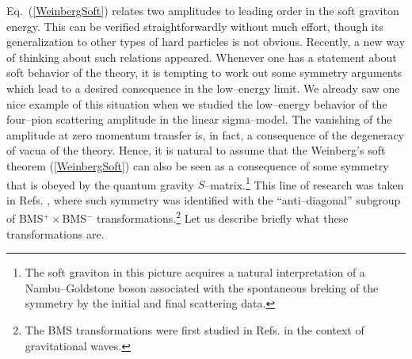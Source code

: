 \documentclass[12pt]{article}
\begin{document}
Eq.~(\ref{WeinbergSoft}) relates two amplitudes to leading order in the soft graviton energy. This can be verified straightforwardly without much effort, though its generalization to other types of hard particles is not obvious.
Recently, a new way of thinking about such relations appeared.
Whenever one has a statement about soft behavior of the theory, it is tempting to work out some symmetry arguments which lead to a desired consequence in the low--energy limit.
We already saw one nice example of this situation when we studied the low--energy behavior of the four--pion scattering amplitude in the linear sigma--model. The vanishing of the amplitude at zero momentum transfer is, in fact, a consequence of the degeneracy of vacua of the theory. Hence, it is natural to assume that the Weinberg's soft theorem (\ref{WeinbergSoft}) can also be seen as a consequence of some symmetry that is obeyed by the quantum gravity $S$--matrix.\footnote{The soft graviton in this picture acquires a natural interpretation of a Nambu--Goldstone boson associated with the spontaneous breking of the symmetry by the initial and final scattering data.} This line of research was taken in Refs. \cite{Strominger:2013jfa,He:2014laa}, where such symmetry was identified with the ``anti--diagonal'' subgroup of BMS$^+\times$BMS$^-$ transformations.\footnote{The BMS transformations were first studied in Refs. \cite{Bondi:1962px,Sachs:1962wk} in the context of gravitational waves.} Let us describe briefly what these transformations are.
\end{document}

